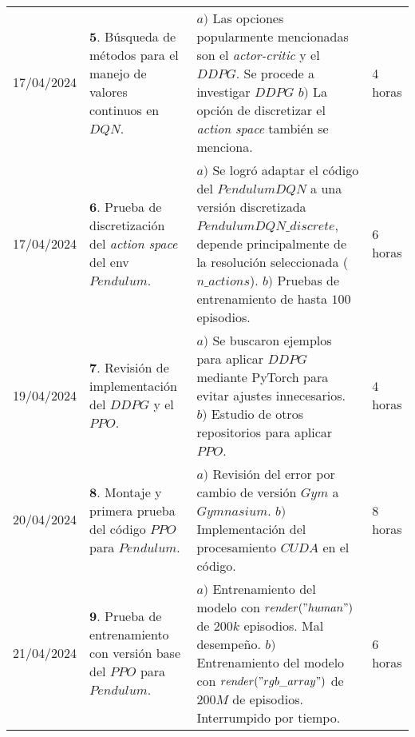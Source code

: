 \documentclass[12pt]{article}
\begin{document}
\hfill\\
\begin{minipage}[h]{\textwidth}
	\centering
	\begin{tabularx}{\textwidth}{|p{2cm}|X|X|p{2cm}|} 
		\hline		
		
	 	17/04/2024 & 
	 	$\mathbf{5}.$ Búsqueda de métodos para el manejo de valores continuos en $DQN$. &
	 	$a)$ Las opciones popularmente mencionadas son el \textit{actor-critic} y el $DDPG$. Se procede a investigar $DDPG$ \newline
	 	$b)$ La opción de discretizar el \textit{action space} también se menciona. \newline & 
	 	4 horas \\
	 	17/04/2024 & 
	 	$\mathbf{6}.$ Prueba de discretización del \textit{action space} del env $Pendulum$. &
	 	$a)$ Se logró adaptar el código del $PendulumDQN$ a una versión discretizada $PendulumDQN\_discrete$, depende principalmente de la resolución seleccionada ($n\_actions$). \newline
	 	$b)$ Pruebas de entrenamiento de hasta $100$ episodios. \newline & 
	 	6 horas \\
	 	19/04/2024 & 
	 	$\mathbf{7}.$ Revisión de implementación del $DDPG$ y el $PPO$. &
	 	$a)$ Se buscaron ejemplos para aplicar \href{https://pytorch.org/tutorials/advanced/coding_ddpg.html?highlight=ddpg}{$DDPG$} mediante PyTorch para evitar ajustes innecesarios. \newline
	 	$b)$ Estudio de otros repositorios para aplicar \href{https://github.com/vwxyzjn/ppo-implementation-details/tree/main}{$PPO$}. \newline & 
	 	4 horas \\
	 	20/04/2024 & 
	 	$\mathbf{8}.$ Montaje y primera prueba del código \href{https://github.com/ericyangyu/PPO-for-Beginners/tree/master}{$PPO$} para $Pendulum$. &
	 	$a)$ Revisión del error por cambio de versión $Gym$ a $Gymnasium$. \newline
	 	$b)$ Implementación del procesamiento $CUDA$ en el código. \newline & 
	 	8 horas \\
	 	21/04/2024 & 
	 	$\mathbf{9}.$ Prueba de entrenamiento con versión base del $PPO$ para $Pendulum$. &
	 	$a)$ Entrenamiento del modelo con $render("human")$ de $200k$ episodios. Mal desempeño. \newline
	 	$b)$ Entrenamiento del modelo con $render("rgb\_ array")$ de $200M$ de episodios. Interrumpido por tiempo. \newline & 
	 	6 horas \\
	 	\hline       
	\end{tabularx}
\end{minipage}
\end{document}

